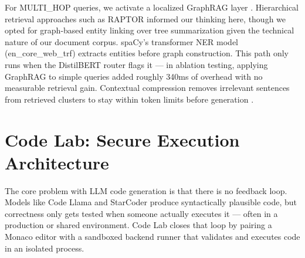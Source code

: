 \documentclass[conference]{IEEEtran}
\begin{document}
For MULTI\_HOP queries, we activate a localized GraphRAG layer \cite{edge2024graphrag}. Hierarchical retrieval approaches such as RAPTOR \cite{sarthi2024raptor} informed our thinking here, though we opted for graph-based entity linking over tree summarization given the technical nature of our document corpus. spaCy's transformer NER model (en\_core\_web\_trf) extracts entities before graph construction. This path only runs when the DistilBERT router flags it --- in ablation testing, applying GraphRAG to simple queries added roughly 340ms of overhead with no measurable retrieval gain. Contextual compression removes irrelevant sentences from retrieved clusters to stay within token limits before generation \cite{shi2023replug}.

\section{Code Lab: Secure Execution Architecture}

The core problem with LLM code generation is that there is no feedback loop. Models like Code Llama \cite{roziere2023codellama} and StarCoder \cite{li2023starcoder} produce syntactically plausible code, but correctness only gets tested when someone actually executes it --- often in a production or shared environment. Code Lab closes that loop by pairing a Monaco editor with a sandboxed backend runner that validates and executes code in an isolated process.
\end{document}
